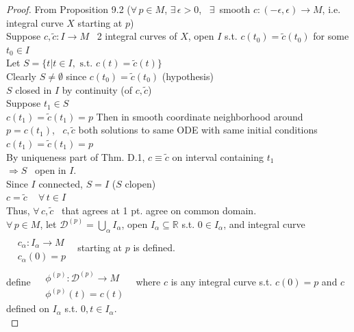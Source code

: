 \documentclass[11pt]{amsart}
\theoremstyle{definition}
\begin{document}
\begin{proof}
From Proposition 9.2 ($\forall \, p \in M$, $\exists \, \epsilon > 0$, \, $\exists \, $ smooth $c:(-\epsilon, \epsilon) \to M$, i.e. integral curve $X$ starting at $p$) \\

Suppose $c,\widetilde{c} : I \to M$ \, 2 integral curves of $X$, open $I$ s.t. $c(t_0) = \widetilde{c}(t_0)$ for some $t_0 \in I$ \\
Let $S = \lbrace t | t \in I, \text{ s.t. } c(t) = \widetilde{c}(t) \rbrace$ \\
Clearly $S \neq \emptyset$ since $c(t_0) = \widetilde{c}(t_0)$ \quad (hypothesis) \\
\quad $S$ closed in $I$ by continuity (of $c, \widetilde{c}$) \\
Suppose $t_1 \in S$ \\
\quad $c(t_1) = \widetilde{c}(t_1)=p$
Then in smooth coordinate neighborhood around $p=c(t_1)$, \, $c, \widetilde{c}$ both solutions to same ODE with same initial conditions $c(t_1) = \widetilde{c}(t_1) = p$ \\

By uniqueness part of Thm. D.1, $c\equiv \widetilde{c}$ on interval containing $t_1$ \\
\quad $\Longrightarrow S $ \, open in $I$. \\
Since $I$ connected, $S=I$ \quad ($S$ clopen) \\
$c= \widetilde{c} \quad \, \forall \, t \in I$ \\
Thus, $\forall \, c , \widetilde{c}$ \, that agrees at 1 pt. agree on common domain.   \\

$\forall \, p \in M$, let $\mathcal{D}^{(p)} = \bigcup_{\alpha} I_{\alpha}$, open $I_{\alpha} \subseteq \mathbb{R}$
\quad s.t. $0 \in I_{\alpha}$, and integral curve $\begin{aligned} & \quad \\
  & c_{\alpha} : I_{\alpha} \to M \\
  & c_{\alpha}(0) = p \end{aligned}$ \, starting at $p$ is defined.  \\

define $\begin{aligned} & \quad \\
  & \phi^{(p)}: \mathcal{D}^{(p)} \to M  \\
  & \phi^{(p)}(t) = c(t) \end{aligned}$ \, where $c$ is any integral curve s.t. $c(0) = p$ and $c$ defined on $I_{\alpha}$ s.t. $0,t \in I_{\alpha}$. \\


\end{proof}
\end{document}
